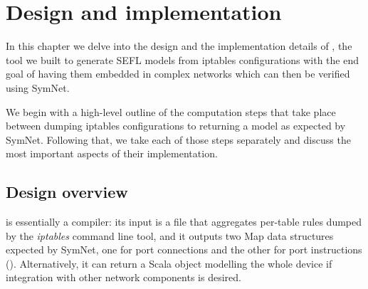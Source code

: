 \chapter{Design and implementation}
In this chapter we delve into the design and the implementation details of
\TOOL, the tool we built to generate SEFL models from iptables configurations
with the end goal of having them embedded in complex networks which can then be
verified using SymNet.

We begin with a high-level outline of the computation steps that take place
between dumping iptables configurations to returning a model as expected by
SymNet.  Following that, we take each of those steps separately and discuss the
most important aspects of their implementation.


\section{Design overview}

\TOOL is essentially a compiler: its input is a file that aggregates per-table
rules dumped by the \emph{iptables} command line tool, and it outputs two Map
data structures expected by SymNet, one for port connections and the other for
port instructions ().  Alternatively,
it can return a Scala object modelling the whole device if integration with
other network components is desired.

